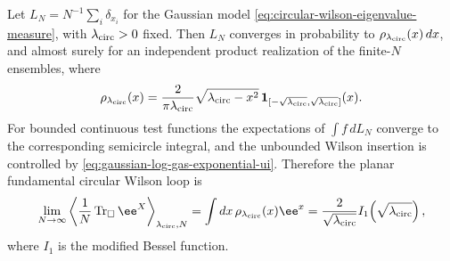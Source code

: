 \begin{theorem}
\label{thm:planar-circular-wilson-bessel}
Let \(L_N=N^{-1}\sum_i\delta_{x_i}\) for the Gaussian model
\eqref{eq:circular-wilson-eigenvalue-measure}, with
\(\lambda_{\rm circ}>0\) fixed.  Then \(L_N\) converges in probability to
\(\rho_{\lambda_{\rm circ}}(x)\,dx\), and almost surely for an independent
product realization of the finite-\(N\) ensembles, where
\begin{equation}
  \rho_{\lambda_{\rm circ}}(x)
  =
  \frac{2}{\pi\lambda_{\rm circ}}
  \sqrt{\lambda_{\rm circ}-x^2}\,
  \mathbf 1_{[-\sqrt{\lambda_{\rm circ}},\sqrt{\lambda_{\rm circ}}]}(x).
  \label{eq:circular-wilson-semicircle-density}
\end{equation}
For bounded continuous test functions the expectations of
\(\int f\,dL_N\) converge to the corresponding semicircle integral, and the
unbounded Wilson insertion is controlled by
\eqref{eq:gaussian-log-gas-exponential-ui}.  Therefore the planar
fundamental circular Wilson loop is
\begin{equation}
  \lim_{N\to\infty}
  \left\langle
    \frac1N\operatorname{Tr}_{\square}\ee^X
  \right\rangle_{\lambda_{\rm circ},N}
  =
  \int dx\,\rho_{\lambda_{\rm circ}}(x)\ee^x
  =
  \frac{2}{\sqrt{\lambda_{\rm circ}}}
  I_1\!\left(\sqrt{\lambda_{\rm circ}}\right),
  \label{eq:planar-circular-wilson-bessel}
\end{equation}
where \(I_1\) is the modified Bessel function.
\end{theorem}

